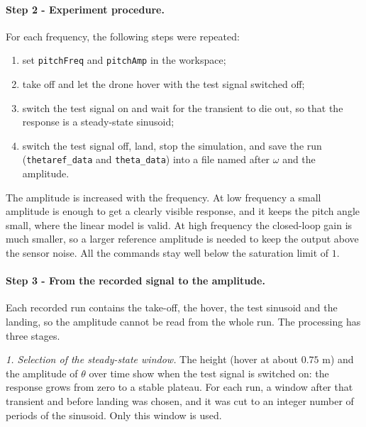 \paragraph{Step 2 - Experiment procedure.}
For each frequency, the following steps were repeated:
\begin{enumerate}
\item set \texttt{pitchFreq} and \texttt{pitchAmp} in the workspace;
\item take off and let the drone hover with the test signal switched off;
\item switch the test signal on and wait for the transient to die out, so that the response is a steady-state sinusoid;
\item switch the test signal off, land, stop the simulation, and save the run (\texttt{thetaref\_data} and \texttt{theta\_data}) into a file named after $\omega$ and the amplitude.
\end{enumerate}
The amplitude is increased with the frequency.
At low frequency a small amplitude is enough to get a clearly visible response, and it keeps the pitch angle small, where the linear model is valid.
At high frequency the closed-loop gain is much smaller, so a larger reference amplitude is needed to keep the output above the sensor noise.
All the commands stay well below the saturation limit of $1$.

\paragraph{Step 3 - From the recorded signal to the amplitude.}
Each recorded run contains the take-off, the hover, the test sinusoid and the landing, so the amplitude cannot be read from the whole run.
The processing has three stages.

\emph{1. Selection of the steady-state window.}
The height (hover at about $0.75$ m) and the amplitude of $\theta$ over time show when the test signal is switched on: the response grows from zero to a stable plateau.
For each run, a window after that transient and before landing was chosen, and it was cut to an integer number of periods of the sinusoid.
Only this window is used.

